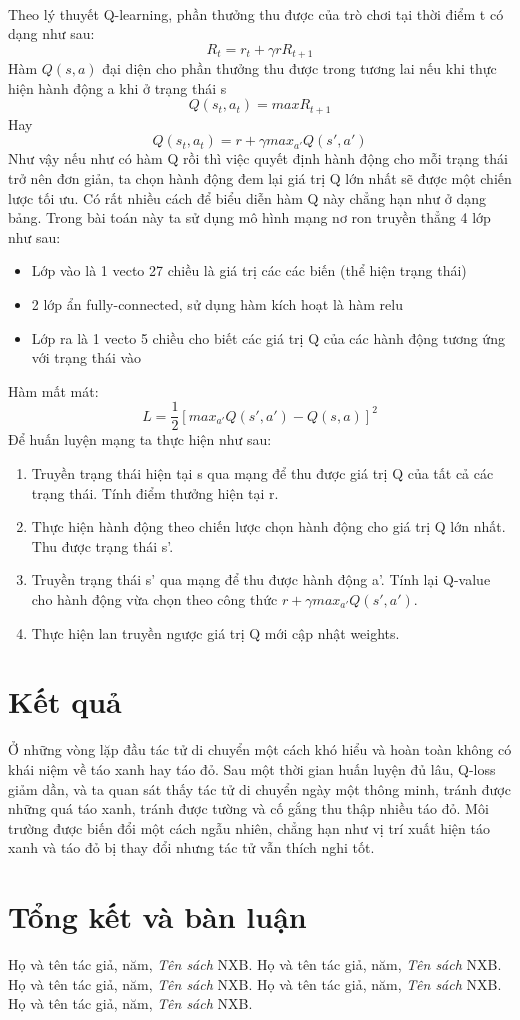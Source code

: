 \documentclass[14pt,a4paper,oneside]{report}		%
\begin{document}
\\
Theo lý thuyết Q-learning, phần thưởng thu được của trò chơi tại thời điểm t có dạng như sau:
$$R_t = r_t+\gamma rR_{t+1}$$
Hàm $Q(s,a)$ đại diện cho phần thưởng thu được trong tương lai nếu khi thực hiện hành động a khi ở trạng thái s 
$$Q(s_t,a_t) = maxR_{t+1}$$
Hay 
$$Q(s_t,a_t) = r + \gamma max_{a'}Q(s',a')$$
Như vậy nếu như có hàm Q rồi thì việc quyết định hành động cho mỗi trạng thái trở nên đơn giản, ta chọn hành động đem lại giá trị Q lớn nhất sẽ được một chiến lược tối ưu. Có rất nhiều cách để biểu diễn hàm Q này chẳng hạn như ở dạng bảng. Trong bài toán này ta sử dụng mô hình mạng nơ ron truyền thẳng 4 lớp như sau:
\begin{itemize}
\item Lớp vào là 1 vecto 27 chiều là giá trị các các biến (thể hiện trạng thái)
\item 2 lớp ẩn fully-connected, sử dụng hàm kích hoạt là hàm relu
\item Lớp ra là 1 vecto 5 chiều cho biết các giá trị Q của các hành động tương ứng với trạng thái vào
\end{itemize}
Hàm mất mát:
$$L=\frac{1}{2}[max_{a'}Q(s',a')-Q(s,a)]^2$$
Để huấn luyện mạng ta thực hiện như sau:
\begin{enumerate}
\item Truyền trạng thái hiện tại s qua mạng để thu được giá trị Q của tất cả các trạng thái. Tính điểm thưởng hiện tại r.
\item Thực hiện hành động theo chiến lược chọn hành động cho giá trị Q lớn nhất. Thu được trạng thái s'.
\item Truyền trạng thái s' qua mạng để thu được hành động a'. Tính lại Q-value cho hành động vừa chọn theo công thức $r+\gamma max_{a'}Q(s',a')$.
\item Thực hiện lan truyền ngược giá trị Q mới cập nhật weights.
\end{enumerate}

\chapter{Kết quả}
	Ở những vòng lặp đầu tác tử di chuyển một cách khó hiểu và hoàn toàn không có khái niệm về táo xanh hay táo đỏ. Sau một thời gian huấn luyện đủ lâu, Q-loss giảm dần, và ta quan sát thấy tác tử di chuyển ngày một thông minh, tránh được những quá táo xanh, tránh được tường và cố gắng thu thập nhiều táo đỏ. Môi trường được biến đổi một cách ngẫu nhiên, chẳng hạn như vị trí xuất hiện táo xanh và táo đỏ bị thay đổi nhưng tác tử vẫn thích nghi tốt.
\chapter{Tổng kết và bàn luận}
\begin{thebibliography}{12}
Họ và tên tác giả, năm, {\it Tên sách} NXB.
Họ và tên tác giả, năm, {\it Tên sách} NXB.
Họ và tên tác giả, năm, {\it Tên sách} NXB.
Họ và tên tác giả, năm, {\it Tên sách} NXB.
Họ và tên tác giả, năm, {\it Tên sách} NXB.
\end{thebibliography}
\end{document}
